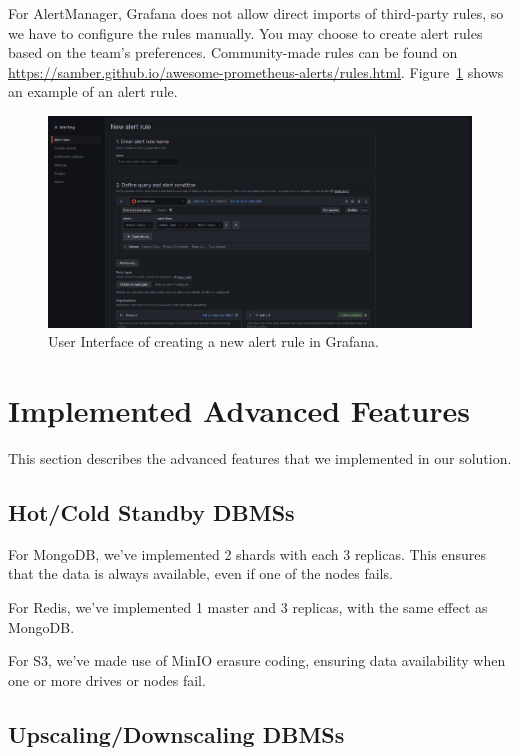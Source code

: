 \documentclass{report}
\begin{document}
    For AlertManager, Grafana does not allow direct imports of third-party rules, so we have to configure the rules manually. You may choose to create alert rules based on the team's preferences. Community-made rules can be found on \url{https://samber.github.io/awesome-prometheus-alerts/rules.html}. Figure~\ref{fig:alerting-create} shows an example of an alert rule.

    \begin{figure}[h]
        \centering
        \includegraphics[width=\textwidth]{images/alerting-create}
        \caption{User Interface of creating a new alert rule in Grafana.}
        \label{fig:alerting-create}
    \end{figure}

    \section{Implemented Advanced Features}\label{sec:advanced-requirements}
    This section describes the advanced features that we implemented in our solution.
    \subsection{Hot/Cold Standby DBMSs}
    For MongoDB, we've implemented 2 shards with each 3 replicas. This ensures that the data is always available, even if one of the nodes fails.

    For Redis, we've implemented 1 master and 3 replicas, with the same effect as MongoDB.

    For S3, we've made use of MinIO erasure coding, ensuring data availability when one or more drives or nodes fail.

    \subsection{Upscaling/Downscaling DBMSs}
\end{document}
